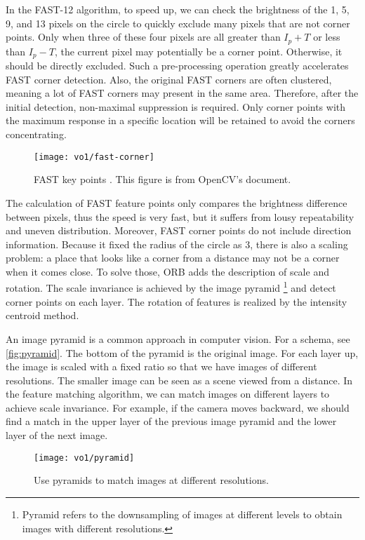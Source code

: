 In the FAST-12 algorithm, to speed up, we can check the brightness of the 1, 5, 9, and 13 pixels on the circle to quickly exclude many pixels that are not corner points. Only when three of these four pixels are all greater than $I_{p}+T$ or less than $I_{p}-T$, the current pixel may potentially be a corner point. Otherwise, it should be directly excluded. Such a pre-processing operation greatly accelerates FAST corner detection. Also, the original FAST corners are often clustered, meaning a lot of FAST corners may present in the same area. Therefore, after the initial detection, non-maximal suppression is required. Only corner points with the maximum response in a specific location will be retained to avoid the corners concentrating.

\begin{figure}[!ht]
	\centering
	\texttt{[image: vo1/fast-corner]}
	\caption{FAST key points {\cite{Rosten2006}}. This figure is from OpenCV's document.}
	\label{fig:fastcorner}
\end{figure}

The calculation of FAST feature points only compares the brightness difference between pixels, thus the speed is very fast, but it suffers from lousy repeatability and uneven distribution. Moreover, FAST corner points do not include direction information. Because it fixed the radius of the circle as 3, there is also a scaling problem: a place that looks like a corner from a distance may not be a corner when it comes close. To solve those, ORB adds the description of scale and rotation. The scale invariance is achieved by the image pyramid \footnote{Pyramid refers to the downsampling of images at different levels to obtain images with different resolutions. } and detect corner points on each layer. The rotation of features is realized by the intensity centroid method.

An image pyramid is a common approach in computer vision. For a schema, see \autoref{fig:pyramid}. The bottom of the pyramid is the original image. For each layer up, the image is scaled with a fixed ratio so that we have images of different resolutions. The smaller image can be seen as a scene viewed from a distance. In the feature matching algorithm, we can match images on different layers to achieve scale invariance. For example, if the camera moves backward, we should find a match in the upper layer of the previous image pyramid and the lower layer of the next image.

\begin{figure}[!t]
    \centering
    \texttt{[image: vo1/pyramid]}\\
    \caption{Use pyramids to match images at different resolutions.}
    \label{fig:pyramid}
\end{figure}

